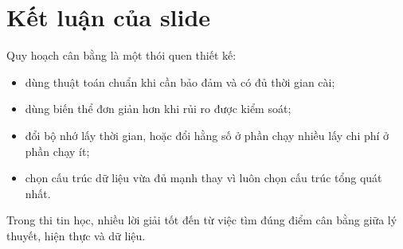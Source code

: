 \documentclass[11pt]{article}
\begin{document}
\section{Kết luận của slide}

Quy hoạch cân bằng là một thói quen thiết kế:
\begin{itemize}
  \item dùng thuật toán chuẩn khi cần bảo đảm và có đủ thời gian cài;
  \item dùng biến thể đơn giản hơn khi rủi ro được kiểm soát;
  \item đổi bộ nhớ lấy thời gian, hoặc đổi hằng số ở phần chạy nhiều lấy chi
  phí ở phần chạy ít;
  \item chọn cấu trúc dữ liệu vừa đủ mạnh thay vì luôn chọn cấu trúc tổng quát
  nhất.
\end{itemize}

Trong thi tin học, nhiều lời giải tốt đến từ việc tìm đúng điểm cân bằng giữa
lý thuyết, hiện thực và dữ liệu.
\end{document}
